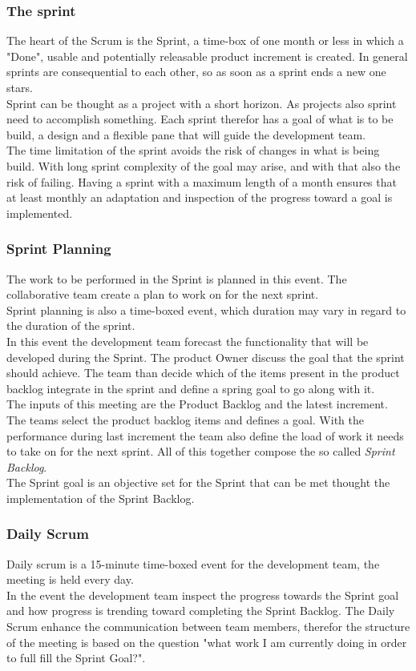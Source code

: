 \documentclass[../main.tex]{subfiles}
\begin{document}
\subsubsection{The sprint}
The heart of the Scrum is the Sprint, a time-box of one month or less in which a "Done", usable and potentially releasable product increment is created. In general sprints are consequential to each other, so as soon as a sprint ends a new one stars. \\
Sprint can be thought as a project with a short horizon. As projects also sprint need to accomplish something. Each sprint therefor has a goal of what is to be build, a design and a flexible pane that will guide the development team.\\
The time limitation of the sprint avoids the risk of changes in what is being build. With long sprint complexity of the goal may arise, and with that also the risk of failing. Having a sprint with a maximum length of a month ensures that at least monthly an adaptation and inspection of the progress toward a goal is implemented. 
\subsubsection{Sprint Planning}
The work to be performed in the Sprint is planned in this event. The collaborative team create a plan to work on for the next sprint. \\
Sprint planning is also a time-boxed event, which duration may vary in regard to the duration of the sprint.\\
In this event the development team forecast the functionality that will be developed during the Sprint. The product Owner discuss the goal that the sprint should achieve. The team than decide which of the items present in the product backlog integrate in the sprint and define a spring goal to go along with it.\\
The inputs of this meeting are the Product Backlog and the latest increment. The teams select the product backlog items and defines a goal. With the performance during last increment the team also define the load of work it needs to take on for the next sprint. All of this together compose the so called \textit{Sprint Backlog}.\\
The Sprint goal is an objective set for the Sprint that can be met thought the implementation of the Sprint Backlog. 
\subsubsection{Daily Scrum}
Daily scrum is a 15-minute time-boxed event for the development team, the meeting is held every day.\\
In the event the development team inspect the progress towards the Sprint goal and how progress is trending toward completing the Sprint Backlog. The Daily Scrum enhance the communication between team members, therefor the structure of the meeting is based on the question "what work I am currently doing in order to full fill the Sprint Goal?".
\end{document}
